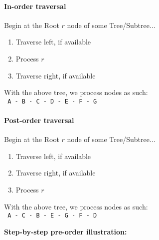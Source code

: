 \documentclass[a4paper,12pt,oneside]{book}
\begin{document}
        \paragraph{In-order traversal}
            Begin at the Root $r$ node of some Tree/Subtree...
            
            \begin{enumerate}
                \item   Traverse left, if available
                \item   Process $r$
                \item   Traverse right, if available
            \end{enumerate}

            With the above tree, we process nodes as such: \\ \tab
            \texttt{ A - B - C - D - E - F - G }

        \paragraph{Post-order traversal}
            Begin at the Root $r$ node of some Tree/Subtree...
            
            \begin{enumerate}
                \item   Traverse left, if available
                \item   Traverse right, if available
                \item   Process $r$
            \end{enumerate}

            With the above tree, we process nodes as such: \\ \tab
            \texttt{ A - C - B - E - G - F - D }

        \newpage

        \begin{center}\textbf{Step-by-step pre-order illustration:}\end{center}
\end{document}
